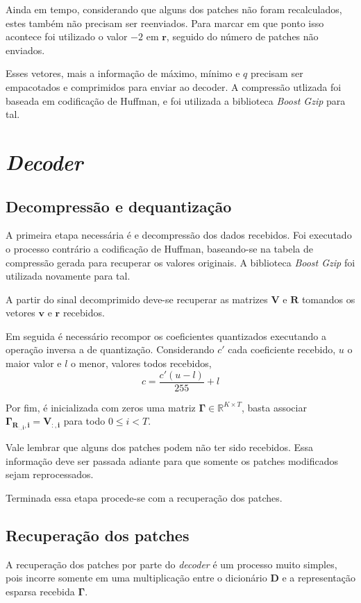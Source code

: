 \documentclass[cic,tc]{iiufrgs}
\renewcommand{\vec}[1]{\bm{#1}}
\newcommand{\mat}[1]{\bm{#1}}
\begin{document}
Ainda em tempo, considerando que alguns dos patches não foram recalculados, estes 
também não precisam ser reenviados. 
Para marcar em que ponto isso acontece foi utilizado o valor $-2$ em $\vec{r}$, 
seguido do número de patches não enviados.

Esses vetores, mais a informação de máximo, mínimo e $q$ precisam ser empacotados 
e comprimidos para enviar ao decoder.
A compressão utlizada foi baseada em codificação de Huffman, e foi utilizada 
a biblioteca \textit{Boost Gzip} para tal.

\section{\textit{Decoder}}

\subsection{Decompressão e dequantização}
\label{sec:decdeq}

A primeira etapa necessária é e decompressão dos dados recebidos. 
Foi executado o processo contrário a codificação de Huffman, 
baseando-se na tabela de compressão gerada para recuperar os valores originais.
A biblioteca \textit{Boost Gzip} foi utilizada novamente para tal.

A partir do sinal decomprimido deve-se recuperar as matrizes $\mat{V}$ e $\mat{R}$
tomandos os vetores $\vec{v}$ e $\vec{r}$ recebidos.

Em seguida é necessário recompor os coeficientes quantizados 
executando a operação inversa a de quantização.
Considerando $c'$ cada coeficiente recebido, $u$ o maior valor e $l$ o menor, 
valores todos recebidos,
\begin{equation*}
    c = \frac{c' (u - l)}{255} + l
\end{equation*}

Por fim, é inicializada com zeros uma matriz $\mat{\Gamma} \in \mathbb{R}^{K \times T}$,
basta associar $\mat{\Gamma_{\mat{R_{:,i}}, i}} = \mat{V_{:,i}}$ para todo $0 \le i < T$.

Vale lembrar que alguns dos patches podem não ter sido recebidos. 
Essa informação deve ser passada adiante para que somente os patches modificados
sejam reprocessados.

Terminada essa etapa procede-se com a recuperação dos patches.

\subsection{Recuperação dos patches}
A recuperação dos patches por parte do \textit{decoder} é um processo muito simples,
pois incorre somente em uma multiplicação entre o dicionário $\mat{D}$ e a 
representação esparsa recebida $\mat{\Gamma}$.
\end{document}
